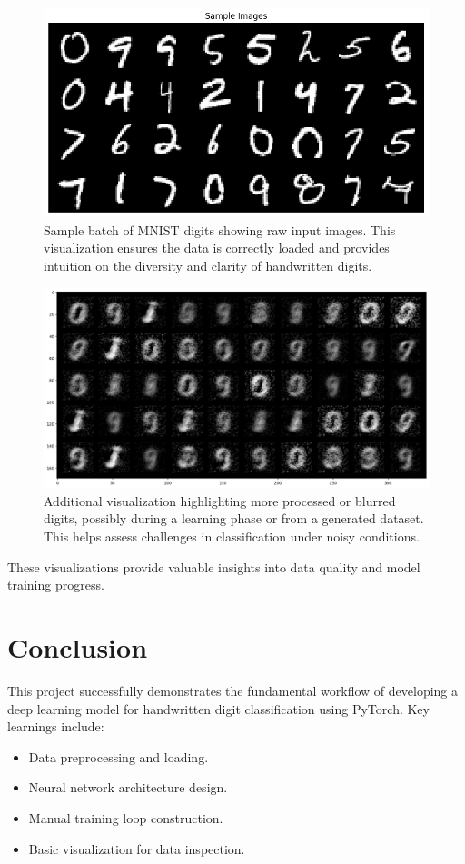 \documentclass{article}
\begin{document}
\begin{figure}[h!]
    \centering
    \includegraphics[width=0.8\linewidth]{output.png}
    \caption{Sample batch of MNIST digits showing raw input images. This visualization ensures the data is correctly loaded and provides intuition on the diversity and clarity of handwritten digits.}
    \label{fig:mnist_sample1}
\end{figure}

\begin{figure}[h!]
    \centering
    \includegraphics[width=0.8\linewidth]{output2.png}
    \caption{Additional visualization highlighting more processed or blurred digits, possibly during a learning phase or from a generated dataset. This helps assess challenges in classification under noisy conditions.}
    \label{fig:mnist_sample2}
\end{figure}

These visualizations provide valuable insights into data quality and model training progress.

\section{Conclusion}
This project successfully demonstrates the fundamental workflow of developing a deep learning model for handwritten digit classification using PyTorch. Key learnings include:
\begin{itemize}
    \item Data preprocessing and loading.
    \item Neural network architecture design.
    \item Manual training loop construction.
    \item Basic visualization for data inspection.
\end{itemize}
\end{document}
